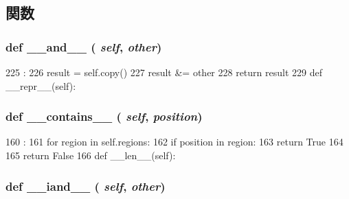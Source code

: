 \subsection{関数}
\hypertarget{classm5_1_1util_1_1region_1_1Regions_af78759c636c9d9a85bb3dd913611e7b6}{
\subsubsection[{\_\-\_\-and\_\-\_\-}]{\setlength{\rightskip}{0pt plus 5cm}def \_\-\_\-and\_\-\_\- ( {\em self}, \/   {\em other})}}
\label{classm5_1_1util_1_1region_1_1Regions_af78759c636c9d9a85bb3dd913611e7b6}



\begin{DoxyCode}
225                             :
226         result = self.copy()
227         result &= other
228         return result
229 
    def __repr__(self):
\end{DoxyCode}
\hypertarget{classm5_1_1util_1_1region_1_1Regions_a31ecdf34e79a47aea99a17eea32b7ac2}{
\subsubsection[{\_\-\_\-contains\_\-\_\-}]{\setlength{\rightskip}{0pt plus 5cm}def \_\-\_\-contains\_\-\_\- ( {\em self}, \/   {\em position})}}
\label{classm5_1_1util_1_1region_1_1Regions_a31ecdf34e79a47aea99a17eea32b7ac2}



\begin{DoxyCode}
160                                     :
161         for region in self.regions:
162             if position in region:
163                 return True
164 
165         return False
166 
    def __len__(self):
\end{DoxyCode}
\hypertarget{classm5_1_1util_1_1region_1_1Regions_a35f5f4cebadafa75c811f7db5370daa5}{
\subsubsection[{\_\-\_\-iand\_\-\_\-}]{\setlength{\rightskip}{0pt plus 5cm}def \_\-\_\-iand\_\-\_\- ( {\em self}, \/   {\em other})}}
\label{classm5_1_1util_1_1region_1_1Regions_a35f5f4cebadafa75c811f7db5370daa5}



